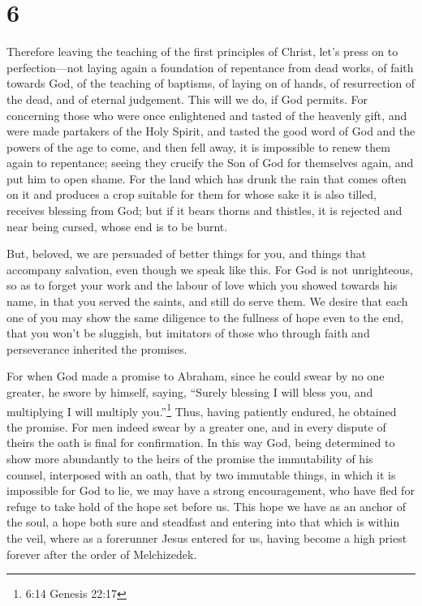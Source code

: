 \hypertarget{section-5}{%
\section{6}\label{section-5}}

 Therefore leaving the teaching of the first principles of
Christ, let's press on to perfection---not laying again a foundation of
repentance from dead works, of faith towards God,  of the
teaching of baptisms, of laying on of hands, of resurrection of the
dead, and of eternal judgement.  This will we do, if God
permits.  For concerning those who were once enlightened and
tasted of the heavenly gift, and were made partakers of the Holy Spirit,
 and tasted the good word of God and the powers of the age
to come,  and then fell away, it is impossible to renew them
again to repentance; seeing they crucify the Son of God for themselves
again, and put him to open shame.  For the land which has
drunk the rain that comes often on it and produces a crop suitable for
them for whose sake it is also tilled, receives blessing from God;
 but if it bears thorns and thistles, it is rejected and
near being cursed, whose end is to be burnt.

 But, beloved, we are persuaded of better things for you,
and things that accompany salvation, even though we speak like this.
 For God is not unrighteous, so as to forget your work and
the labour of love which you showed towards his name, in that you served
the saints, and still do serve them.  We desire that each
one of you may show the same diligence to the fullness of hope even to
the end,  that you won't be sluggish, but imitators of
those who through faith and perseverance inherited the promises.

 For when God made a promise to Abraham, since he could
swear by no one greater, he swore by himself,  saying,
``Surely blessing I will bless you, and multiplying I will multiply
you.''\footnote{6:14 Genesis 22:17}  Thus, having patiently
endured, he obtained the promise.  For men indeed swear by
a greater one, and in every dispute of theirs the oath is final for
confirmation.  In this way God, being determined to show
more abundantly to the heirs of the promise the immutability of his
counsel, interposed with an oath,  that by two immutable
things, in which it is impossible for God to lie, we may have a strong
encouragement, who have fled for refuge to take hold of the hope set
before us.  This hope we have as an anchor of the soul, a
hope both sure and steadfast and entering into that which is within the
veil,  where as a forerunner Jesus entered for us, having
become a high priest forever after the order of Melchizedek.

